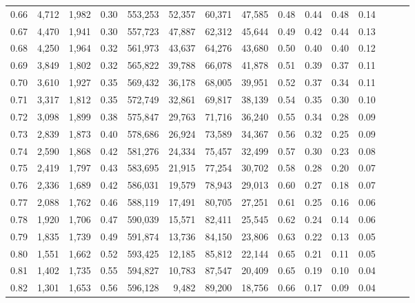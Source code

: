 \begin{tabular}{rrrrrrrrrrrrrrr}
0.66 &   4,712 &  1,982 &  0.30 &  553,253 &   52,357 &   60,371 &   47,585 &  0.48 &  0.44 &  0.48 &      0.14 \\
0.67 &   4,470 &  1,941 &  0.30 &  557,723 &   47,887 &   62,312 &   45,644 &  0.49 &  0.42 &  0.44 &      0.13 \\
0.68 &   4,250 &  1,964 &  0.32 &  561,973 &   43,637 &   64,276 &   43,680 &  0.50 &  0.40 &  0.40 &      0.12 \\
0.69 &   3,849 &  1,802 &  0.32 &  565,822 &   39,788 &   66,078 &   41,878 &  0.51 &  0.39 &  0.37 &      0.11 \\
0.70 &   3,610 &  1,927 &  0.35 &  569,432 &   36,178 &   68,005 &   39,951 &  0.52 &  0.37 &  0.34 &      0.11 \\
0.71 &   3,317 &  1,812 &  0.35 &  572,749 &   32,861 &   69,817 &   38,139 &  0.54 &  0.35 &  0.30 &      0.10 \\
0.72 &   3,098 &  1,899 &  0.38 &  575,847 &   29,763 &   71,716 &   36,240 &  0.55 &  0.34 &  0.28 &      0.09 \\
0.73 &   2,839 &  1,873 &  0.40 &  578,686 &   26,924 &   73,589 &   34,367 &  0.56 &  0.32 &  0.25 &      0.09 \\
0.74 &   2,590 &  1,868 &  0.42 &  581,276 &   24,334 &   75,457 &   32,499 &  0.57 &  0.30 &  0.23 &      0.08 \\
0.75 &   2,419 &  1,797 &  0.43 &  583,695 &   21,915 &   77,254 &   30,702 &  0.58 &  0.28 &  0.20 &      0.07 \\
0.76 &   2,336 &  1,689 &  0.42 &  586,031 &   19,579 &   78,943 &   29,013 &  0.60 &  0.27 &  0.18 &      0.07 \\
0.77 &   2,088 &  1,762 &  0.46 &  588,119 &   17,491 &   80,705 &   27,251 &  0.61 &  0.25 &  0.16 &      0.06 \\
0.78 &   1,920 &  1,706 &  0.47 &  590,039 &   15,571 &   82,411 &   25,545 &  0.62 &  0.24 &  0.14 &      0.06 \\
0.79 &   1,835 &  1,739 &  0.49 &  591,874 &   13,736 &   84,150 &   23,806 &  0.63 &  0.22 &  0.13 &      0.05 \\
0.80 &   1,551 &  1,662 &  0.52 &  593,425 &   12,185 &   85,812 &   22,144 &  0.65 &  0.21 &  0.11 &      0.05 \\
0.81 &   1,402 &  1,735 &  0.55 &  594,827 &   10,783 &   87,547 &   20,409 &  0.65 &  0.19 &  0.10 &      0.04 \\
0.82 &   1,301 &  1,653 &  0.56 &  596,128 &    9,482 &   89,200 &   18,756 &  0.66 &  0.17 &  0.09 &      0.04 \\

\end{tabular}
